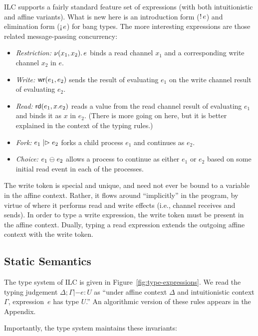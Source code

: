 ILC supports a fairly standard feature set of expressions (with both
intuitionistic and affine variants). What is new here is an introduction form
(${!}\,{e}$) and elimination form ($\textnormal{!`}\,{e}$) for bang types. The more
interesting expressions are those related message-passing concurrency:
\begin{itemize}[leftmargin=*]
  \item \emph{Restriction:} $\nu(x_1, x_2).\,e$ binds a read channel $x_1$ and
    a corresponding write channel $x_2$ in $e$.
  \item \emph{Write:} $\textnormal{\textsf{wr}}\mathsf{(}{e_1},{e_2}\mathsf{)}$ sends the result of evaluating $e_1$ on
    the write channel result of evaluating $e_2$.
  \item \emph{Read:} $\textnormal{\textsf{rd}}\mathsf{(}{e_1},{x}.{e_2}\mathsf{)}$ reads a value from the read channel
    result of evaluating $e_1$ and binds it as $x$ in $e_2$. (There is more
    going on here, but it is better explained in the context of the typing
    rules.)
  \item \emph{Fork:} $e_1 \mathrel{|\rhd} e_2$ forks a child process $e_1$ and
    continues as $e_2$.
  \item \emph{Choice:} $e_1 \mathrel{\ominus} e_2$ allows a process to continue as
    either $e_1$ or $e_2$ based on some initial read event in each of the
    processes.
\end{itemize}

The write token is special and unique, and need not ever be bound to a variable
in the affine context.  Rather, it flows around “implicitly” in the program, by
virtue of where it performs read and write effects (i.e., channel receives and
sends).  In order to type a write expression, the write token must be present in
the affine context. Dually, typing a read expression extends the outgoing affine
context with the write token.

\subsection{Static Semantics}
\label{subsec:types}

The type system of ILC is given in Figure~\ref{fig:type-expressions}.  We read
the typing judgement $\Delta; \Gamma |- e : U$ as ``under affine context $\Delta$ and
intuitionistic context $\Gamma$, expression~$e$ has type $U$.'' An algorithmic
version of these rules appears in the Appendix.
  
Importantly, the type system maintains these invariants:

